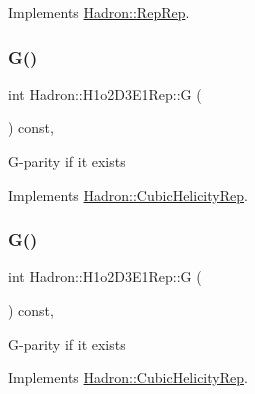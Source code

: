 Implements \mbox{\hyperlink{structHadron_1_1RepRep_a92c8802e5ed7afd7da43ccfd5b7cd92b}{Hadron\+::\+Rep\+Rep}}.

\mbox{\label{structHadron_1_1H1o2D3E1Rep_a64320464ed31b286a27f7604c1ccf745}} 
\subsubsection{\texorpdfstring{G()}{G()}\hspace{0.1cm}{\footnotesize\ttfamily [1/3]}}
{\footnotesize\ttfamily int Hadron\+::\+H1o2\+D3\+E1\+Rep\+::G (\begin{DoxyParamCaption}{ }\end{DoxyParamCaption}) const\hspace{0.3cm}{\ttfamily [inline]}, {\ttfamily [virtual]}}

G-\/parity if it exists 

Implements \mbox{\hyperlink{structHadron_1_1CubicHelicityRep_a50689f42be1e6170aa8cf6ad0597018b}{Hadron\+::\+Cubic\+Helicity\+Rep}}.

\mbox{\label{structHadron_1_1H1o2D3E1Rep_a64320464ed31b286a27f7604c1ccf745}} 
\subsubsection{\texorpdfstring{G()}{G()}\hspace{0.1cm}{\footnotesize\ttfamily [2/3]}}
{\footnotesize\ttfamily int Hadron\+::\+H1o2\+D3\+E1\+Rep\+::G (\begin{DoxyParamCaption}{ }\end{DoxyParamCaption}) const\hspace{0.3cm}{\ttfamily [inline]}, {\ttfamily [virtual]}}

G-\/parity if it exists 

Implements \mbox{\hyperlink{structHadron_1_1CubicHelicityRep_a50689f42be1e6170aa8cf6ad0597018b}{Hadron\+::\+Cubic\+Helicity\+Rep}}.

\mbox{\label{structHadron_1_1H1o2D3E1Rep_a64320464ed31b286a27f7604c1ccf745}} 
